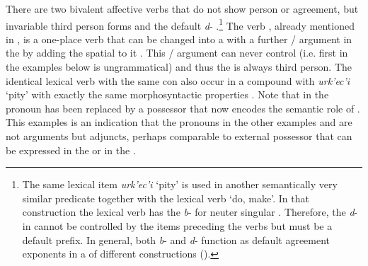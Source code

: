 There are two bivalent affective verbs that do not show person or  agreement, but invariable third person forms and the default   \textit{d}- .\footnote{The same lexical item \textit{urk'ec'i} `pity' is used in another semantically very similar predicate together with the lexical verb `do, make'. In that construction the lexical verb has the  \textit{b}- for neuter singular . Therefore, the  \textit{d}- in  cannot be controlled by the items preceding the verbs but must be a default prefix. In general, both \textit{b}- and \textit{d}- function as default agreement exponents in a  of different constructions ().} The verb  , already mentioned in , is a one-place verb that can be changed into a  with a further / argument in the  by adding the spatial   to it . This / argument can never control  (i.e. first  in the examples below is ungrammatical) and thus the  is always third person. The identical lexical verb with the same  con also occur in a compound with \textit{urk'ec'i} `pity' with exactly the same morphosyntactic properties . Note that in  the  pronoun has been replaced by a  possessor that now encodes the semantic role of . This examples is an indication that the  pronouns in the other examples  and  are not arguments but adjuncts, perhaps comparable to external possessor that can be expressed in the  or in the . 
%


